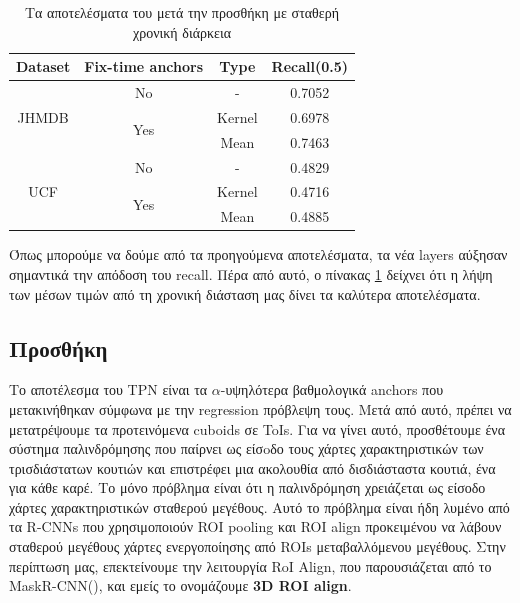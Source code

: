 \en
\begin{table}[h]
  \centering
  \begin{tabular}{||c | c | c || c ||}
    \hline
    \textbf{Dataset} & \textbf{Fix-time anchors} & \textbf{Type} & \textbf{Recall(0.5)} \\
    \hline  \hline
    \multirow{3}{4em}{JHMDB} & No &  - & 0.7052 \\
    \cline{2-4}
    {} & \multirow{2}{*}{Yes} & Kernel & 0.6978 \\
    \cline{3-4}
    {} & {} & Mean & 0.7463 \\
    \hline
    \multirow{3}{4em}{UCF} & No & - & 0.4829 \\
    \cline{2-4}
    {} & \multirow{2}{*}{Yes} & Kernel & 0.4716 \\
    \cline{3-4}
    {} & {} & Mean & 0.4885 \\
    \hline      
  \end{tabular}
  \caption{\gr Τα αποτελέσματα του  μετά την προσθήκη  με σταθερή χρονική διάρκεια}
  \label{table:gr_add_16}
\end{table}
\gr

Όπως μπορούμε να δούμε από τα προηγούμενα αποτελέσματα, τα νέα \en layers \gr αύξησαν σημαντικά την απόδοση του \en recall\gr. Πέρα από αυτό, ο πίνακας \ref{table:gr_add_16} δείχνει ότι
η λήψη των μέσων τιμών από τη χρονική διάσταση μας δίνει τα καλύτερα αποτελέσματα.

\gr
\subsection{\gr Προσθήκη }
Το αποτέλεσμα του \en TPN  \gr είναι τα $\alpha$-υψηλότερα βαθμολογικά \en anchors \gr που μετακινήθηκαν σύμφωνα με την \en regression \gr πρόβλεψη τους. Μετά από αυτό, πρέπει να μετατρέψουμε τα
προτεινόμενα \en cuboids \gr σε \en ToIs\gr.
Για να γίνει αυτό, προσθέτουμε ένα σύστημα παλινδρόμησης που παίρνει ως είσoδο τους χάρτες χαρακτηριστικών των τρισδιάστατων κουτιών και επιστρέφει μια ακολουθία από δισδιάσταστα κουτιά,
ένα για κάθε καρέ.
Το μόνο πρόβλημα είναι ότι η παλινδρόμηση χρειάζεται ως είσοδο χάρτες χαρακτηριστικών  σταθερού μεγέθους. Αυτό το πρόβλημα είναι ήδη λυμένο από τα \en R-CNNs  \gr που χρησιμοποιούν \en ROI pooling \gr
και \en ROI align \gr προκειμένου να λάβουν σταθερού μεγέθους χάρτες ενεργοποίησης από \en ROIs \gr μεταβαλλόμενου μεγέθους. Στην περίπτωση μας, επεκτείνουμε την λειτουργία \en RoI Align\gr ,
που παρουσιάζεται από το \en MaskR-CNN(\cite{DBLP:journals/corr/HeGDG17})\gr, και εμείς το ονομάζουμε \en\textbf{3D ROI align}.
